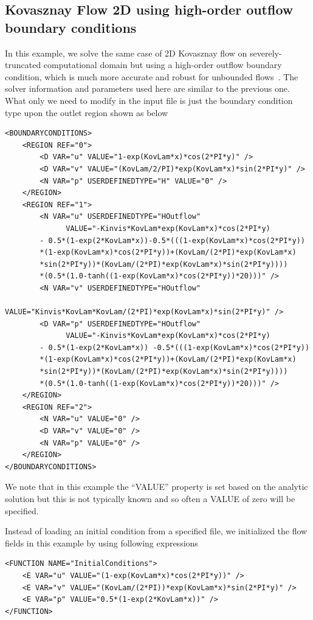 \subsection{Kovasznay Flow 2D using high-order outflow boundary conditions}
\label{s:incns:kovasznay2D_HOBC}
In this example, we solve the same case of 2D Kovasznay flow on
severely-truncated computational domain but using a high-order outflow
boundary condition, which is much more accurate and robust for
unbounded flows~\cite{DoKa14}. The solver information and parameters
used here are similar to the previous one. What only we need to modify
in the input file is just the boundary condition type upon the outlet
region shown as below
\begin{lstlisting}[style=XMLStyle]
<BOUNDARYCONDITIONS>
    <REGION REF="0">
        <D VAR="u" VALUE="1-exp(KovLam*x)*cos(2*PI*y)" />
        <D VAR="v" VALUE="(KovLam/2/PI)*exp(KovLam*x)*sin(2*PI*y)" />
        <N VAR="p" USERDEFINEDTYPE="H" VALUE="0" />
    </REGION>
    <REGION REF="1">
        <N VAR="u" USERDEFINEDTYPE="HOutflow" 
              VALUE="-Kinvis*KovLam*exp(KovLam*x)*cos(2*PI*y) 
		- 0.5*(1-exp(2*KovLam*x))-0.5*(((1-exp(KovLam*x)*cos(2*PI*y))
		*(1-exp(KovLam*x)*cos(2*PI*y))+(KovLam/(2*PI)*exp(KovLam*x)
		*sin(2*PI*y))*(KovLam/(2*PI)*exp(KovLam*x)*sin(2*PI*y))))
		*(0.5*(1.0-tanh((1-exp(KovLam*x)*cos(2*PI*y))*20)))" />
        <N VAR="v" USERDEFINEDTYPE="HOutflow" 
              VALUE="Kinvis*KovLam*KovLam/(2*PI)*exp(KovLam*x)*sin(2*PI*y)" />
        <D VAR="p" USERDEFINEDTYPE="HOutflow" 
              VALUE="-Kinvis*KovLam*exp(KovLam*x)*cos(2*PI*y)
		- 0.5*(1-exp(2*KovLam*x)) -0.5*(((1-exp(KovLam*x)*cos(2*PI*y))
		*(1-exp(KovLam*x)*cos(2*PI*y))+(KovLam/(2*PI)*exp(KovLam*x)
		*sin(2*PI*y))*(KovLam/(2*PI)*exp(KovLam*x)*sin(2*PI*y))))
		*(0.5*(1.0-tanh((1-exp(KovLam*x)*cos(2*PI*y))*20)))" />
    </REGION>
    <REGION REF="2">
        <N VAR="u" VALUE="0" />
        <D VAR="v" VALUE="0" />
        <N VAR="p" VALUE="0" />
    </REGION>
</BOUNDARYCONDITIONS>
\end{lstlisting} 
We note that in this example the ``VALUE'' property is set based on
the analytic solution but this is not typically known and so often a
VALUE of zero will be specified.

Instead of loading an initial condition from a specified file, we initialized the flow fields in this example by using following expressions
\begin{lstlisting}[style=XMLStyle]
<FUNCTION NAME="InitialConditions">
    <E VAR="u" VALUE="(1-exp(KovLam*x)*cos(2*PI*y))" />
    <E VAR="v" VALUE="(KovLam/(2*PI))*exp(KovLam*x)*sin(2*PI*y)" />
    <E VAR="p" VALUE="0.5*(1-exp(2*KovLam*x))" />
</FUNCTION>
\end{lstlisting}
